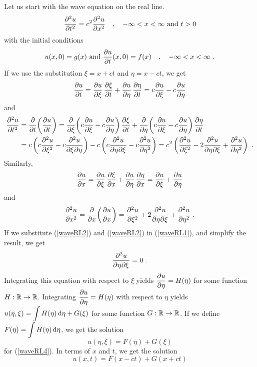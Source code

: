 Let us start with the wave equation on the real line.
\begin{equation}\label{waveRL1}
  \pdydxn{u}{t}{2} = c^2 \pdydxn{u}{x}{2} \quad , \quad
  -\infty < x < \infty \ \text{and} \ t > 0
\end{equation}
with the initial conditions
\begin{equation} \label{waveRL5}
u(x,0) = g(x) \ \text{and} \ \pdydx{u}{t}(x,0) = f(x) \quad , \quad
 -\infty < x < \infty \ .
\end{equation}
If we use the substitution $\xi = x+ ct$ and $\eta = x- ct$, we get
\[
  \pdydx{u}{t} = \pdydx{u}{\xi}\,\pdydx{\xi}{t} +
  \pdydx{u}{\eta}\, \pdydx{\eta}{t} = c \pdydx{u}{\xi} - c \pdydx{u}{\eta}
\]
and
\begin{align}
\pdydxn{u}{t}{2} &= \pdfdx{\left(\pdydx{u}{t}\right)}{t}
= \pdfdx{\left(c \pdydx{u}{\xi} - c \pdydx{u}{\eta}\right)}{\xi}
\,\pdydx{\xi}{t} +
\pdfdx{\left(c \pdydx{u}{\xi} - c \pdydx{u}{\eta}\right)}{\eta}
\,\pdydx{\eta}{t} \nonumber \\
&  = c \left(c \pdydxn{u}{\xi}{2} - c \pdydxnm{u}{\xi}{\eta}{2}{}{}\right)
- c \left(c \pdydxnm{u}{\eta}{\xi}{2}{}{} - c \pdydxn{u}{\eta}{2}\right)
= c^2 \left( \pdydxn{u}{\xi}{2} - 2 \pdydxnm{u}{\eta}{\xi}{2}{}{}
+ \pdydxn{u}{\eta}{2}\right) \ .  \label{waveRL2}
\end{align}
Similarly,
\[
  \pdydx{u}{x} = \pdydx{u}{\xi}\,\pdydx{\xi}{x} +
  \pdydx{u}{\eta}\, \pdydx{\eta}{x} = \pdydx{u}{\xi} + \pdydx{u}{\eta}
\]
and
\begin{equation} \label{waveRL3}
  \pdydxn{u}{x}{2} = \pdfdx{\left(\pdydx{u}{x}\right)}{x}
  = \pdydxn{u}{\xi}{2} + 2 \pdydxnm{u}{\eta}{\xi}{2}{}{}
+ \pdydxn{u}{\eta}{2} \ .
\end{equation}
If we substitute (\ref{waveRL2}) and (\ref{waveRL2}) in
(\ref{waveRL1}), and simplify the result, we get
\begin{equation} \label{waveRL4}
  \pdydxnm{u}{\eta}{\xi}{2}{}{} = 0 \ .
\end{equation}
Integrating this equation with respect to $\xi$ yields
$\displaystyle \pdydx{u}{\eta} = H(\eta)$ for
some function $H:\RR\rightarrow \RR$.  Integrating
$\displaystyle \pdydx{u}{\eta} = H(\eta)$ with
respect to $\eta$ yields
$\displaystyle u(\eta,\xi) = \int H(\eta) \dx{\eta} + G(\xi)$ for some
function $G:\RR\rightarrow \RR$.  If we define
$\displaystyle F(\eta) = \int H(\eta) \dx{\eta}$, we get the solution
\[
u(\eta,\xi) = F(\eta) + G(\xi)
\]
for (\ref{waveRL4}).  In terms of $x$ and $t$, we get the solution
\[
u(x,t) = F(x-ct) + G(x+ct)
\]
